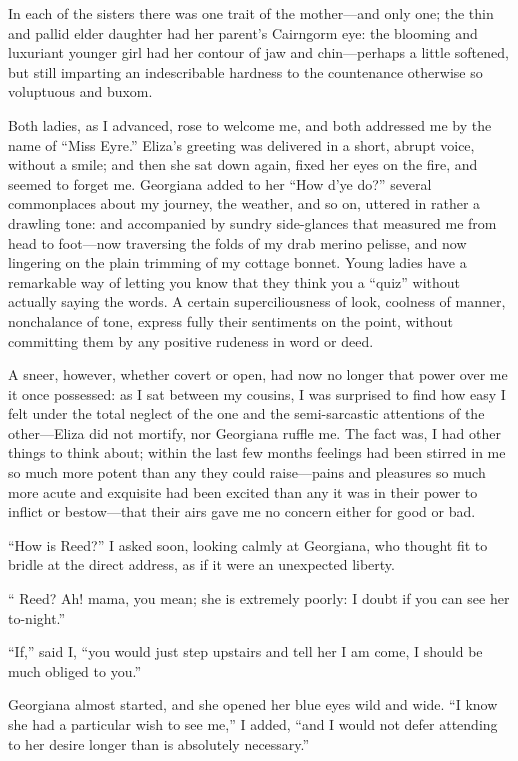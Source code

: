 In each of the sisters there was one trait of the mother---and only one;
the thin and pallid elder daughter had her parent's Cairngorm eye: the
blooming and luxuriant younger girl had her contour of jaw and
chin---perhaps a little softened, but still imparting an indescribable
hardness to the countenance otherwise so voluptuous and buxom.

Both ladies, as I advanced, rose to welcome me, and both addressed me by
the name of \enquote{Miss Eyre.} Eliza's greeting was delivered in a
short, abrupt voice, without a smile; and then she sat down again, fixed
her eyes on the fire, and seemed to forget me. Georgiana added to her
\enquote{How d'ye do?} several commonplaces about my journey, the
weather, and so on, uttered in rather a drawling tone: and accompanied
by sundry side-glances that measured me from head to foot---now
traversing the folds of my drab merino pelisse, and now lingering on the
plain trimming of my cottage bonnet. Young ladies have a remarkable way
of letting you know that they think you a \enquote{quiz} without
actually saying the words. A certain superciliousness of look, coolness
of manner, nonchalance of tone, express fully their sentiments on the
point, without committing them by any positive rudeness in word or deed.

A sneer, however, whether covert or open, had now no longer that power
over me it once possessed: as I sat between my cousins, I was surprised
to find how easy I felt under the total neglect of the one and the
semi-sarcastic attentions of the other---Eliza did not mortify, nor
Georgiana ruffle me. The fact was, I had other things to think about;
within the last few months feelings had been stirred in me so much more
potent than any they could raise---pains and pleasures so much more
acute and exquisite had been excited than any it was in their power to
inflict or bestow---that their airs gave me no concern either for good
or bad.

\enquote{How is \Mrs{} Reed?} I asked soon, looking calmly at Georgiana,
who thought fit to bridle at the direct address, as if it were an
unexpected liberty.

\enquote{\Mrs{} Reed? Ah! mama, you mean; she is extremely poorly: I
doubt if you can see her to-night.}

\enquote{If,} said I, \enquote{you would just step upstairs and tell her
I am come, I should be much obliged to you.}

Georgiana almost started, and she opened her blue eyes wild and wide. 
\enquote{I know she had a particular wish to see me,} I added,
\enquote{and I would not defer attending to her desire longer than is
absolutely necessary.}


